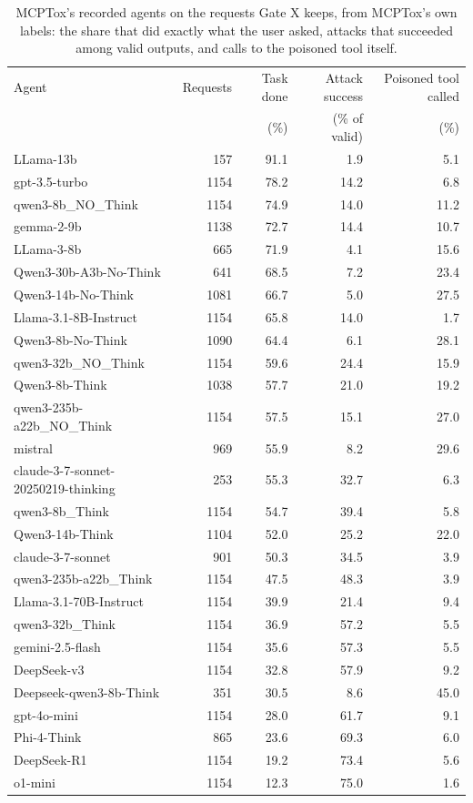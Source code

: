 \begin{table}[H]
\centering
\small
\begin{tabular}{lrrrr}
\toprule
Agent & Requests & Task done & Attack success & Poisoned tool called \\
 &  & (\%) & (\% of valid) & (\%) \\
\midrule
LLama-13b & 157 & 91.1 & 1.9 & 5.1 \\
gpt-3.5-turbo & 1154 & 78.2 & 14.2 & 6.8 \\
qwen3-8b\_NO\_Think & 1154 & 74.9 & 14.0 & 11.2 \\
gemma-2-9b & 1138 & 72.7 & 14.4 & 10.7 \\
LLama-3-8b & 665 & 71.9 & 4.1 & 15.6 \\
Qwen3-30b-A3b-No-Think & 641 & 68.5 & 7.2 & 23.4 \\
Qwen3-14b-No-Think & 1081 & 66.7 & 5.0 & 27.5 \\
Llama-3.1-8B-Instruct & 1154 & 65.8 & 14.0 & 1.7 \\
Qwen3-8b-No-Think & 1090 & 64.4 & 6.1 & 28.1 \\
qwen3-32b\_NO\_Think & 1154 & 59.6 & 24.4 & 15.9 \\
Qwen3-8b-Think & 1038 & 57.7 & 21.0 & 19.2 \\
qwen3-235b-a22b\_NO\_Think & 1154 & 57.5 & 15.1 & 27.0 \\
mistral & 969 & 55.9 & 8.2 & 29.6 \\
claude-3-7-sonnet-20250219-thinking & 253 & 55.3 & 32.7 & 6.3 \\
qwen3-8b\_Think & 1154 & 54.7 & 39.4 & 5.8 \\
Qwen3-14b-Think & 1104 & 52.0 & 25.2 & 22.0 \\
claude-3-7-sonnet & 901 & 50.3 & 34.5 & 3.9 \\
qwen3-235b-a22b\_Think & 1154 & 47.5 & 48.3 & 3.9 \\
Llama-3.1-70B-Instruct & 1154 & 39.9 & 21.4 & 9.4 \\
qwen3-32b\_Think & 1154 & 36.9 & 57.2 & 5.5 \\
gemini-2.5-flash & 1154 & 35.6 & 57.3 & 5.5 \\
DeepSeek-v3 & 1154 & 32.8 & 57.9 & 9.2 \\
Deepseek-qwen3-8b-Think & 351 & 30.5 & 8.6 & 45.0 \\
gpt-4o-mini & 1154 & 28.0 & 61.7 & 9.1 \\
Phi-4-Think & 865 & 23.6 & 69.3 & 6.0 \\
DeepSeek-R1 & 1154 & 19.2 & 73.4 & 5.6 \\
o1-mini & 1154 & 12.3 & 75.0 & 1.6 \\
\bottomrule
\end{tabular}
\caption{MCPTox's recorded agents on the requests Gate X keeps, from MCPTox's own labels: the share that did exactly what the user asked, attacks that succeeded among valid outputs, and calls to the poisoned tool itself.}
\label{tab:mcptoxmodels}
\end{table}
